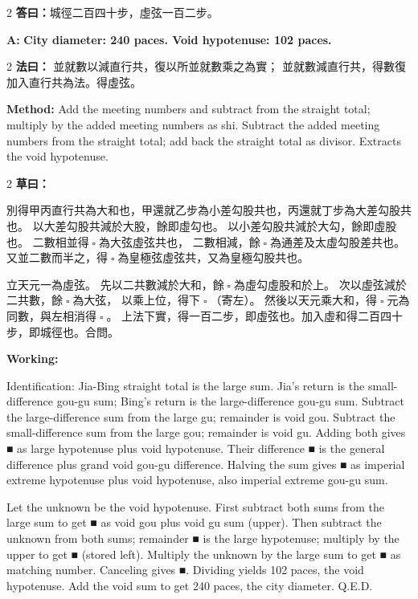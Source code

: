 \documentclass[11pt,a4paper]{article}
\let\origsquare\square
\renewcommand{\square}{\ensuremath{\origsquare}}%
\newcommand{\fayue}[1]{%
  \noindent\textcolor{methodcolor}{\textbf{法曰：}}{\tradfont #1}\par\nopagebreak%
}
\newcommand{\fayueeng}[1]{%
  \noindent\textcolor{engcolor}{\textbf{Method: }}{#1}\par\nopagebreak%
}
\newcommand{\tsaoyue}[1]{%
  \noindent\textcolor{workcolor}{\textbf{草曰：}}{\tradfont #1}\par%
}
\newcommand{\tsaoyueeng}[1]{%
  \noindent\textcolor{engcolor}{\textbf{Working: }}{\small #1}\par%
}
\newcommand{\dayue}[1]{%
  \noindent\textcolor{anscolor}{\textbf{答曰：}}{\tradfont #1}\par\nopagebreak%
}
\newcommand{\dayueeng}[1]{%
  \noindent\textcolor{engcolor}{\textbf{A: }}{\bfseries #1}\par\nopagebreak%
}
\begin{document}
\begin{paracol}{2}
\dayue{城徑二百四十步，虛弦一百二步。}
\switchcolumn
\dayueeng{City diameter: 240 paces. Void hypotenuse: 102 paces.}
\end{paracol}

\begin{paracol}{2}
\fayue{%
並就數以減直行共，復以所並就數乘之為實；
並就數減直行共，得數復加入直行共為法。得虛弦。}
\switchcolumn
\fayueeng{%
Add the meeting numbers and subtract from the straight total; multiply by the added meeting numbers as shi. Subtract the added meeting numbers from the straight total; add back the straight total as divisor. Extracts the void hypotenuse.}
\end{paracol}

\begin{paracol}{2}
\tsaoyue{%
別得甲丙直行共為大和也，甲還就乙步為小差勾股共也，丙還就丁步為大差勾股共也。
以大差勾股共減於大股，餘即虛勾也。
以小差勾股共減於大勾，餘即虛股也。
二數相並得$ \; \square \; $為大弦虛弦共也，
二數相減，餘$ \; \square \; $為通差及太虛勾股差共也。
又並二數而半之，得$ \; \square \; $為皇極弦虛弦共，又為皇極勾股共也。

立天元一為虛弦。
先以二共數減於大和，餘$ \; \square \; $為虛勾虛股和於上。
次以虛弦減於二共數，餘$ \; \square \; $為大弦，
以乘上位，得下$ \; \square \; $（寄左）。
然後以天元乘大和，得$ \; \square \; $元為同數，與左相消得$ \; \square \; $。
上法下實，得一百二步，即虛弦也。加入虛和得二百四十步，即城徑也。合問。}
\switchcolumn
\tsaoyueeng{%
Identification: Jia-Bing straight total is the large sum. Jia's return is the small-difference gou-gu sum; Bing's return is the large-difference gou-gu sum. Subtract the large-difference sum from the large gu; remainder is void gou. Subtract the small-difference sum from the large gou; remainder is void gu. Adding both gives ■ as large hypotenuse plus void hypotenuse. Their difference ■ is the general difference plus grand void gou-gu difference. Halving the sum gives ■ as imperial extreme hypotenuse plus void hypotenuse, also imperial extreme gou-gu sum.

Let the unknown be the void hypotenuse. First subtract both sums from the large sum to get ■ as void gou plus void gu sum (upper). Then subtract the unknown from both sums; remainder ■ is the large hypotenuse; multiply by the upper to get ■ (stored left). Multiply the unknown by the large sum to get ■ as matching number. Canceling gives ■. Dividing yields 102 paces, the void hypotenuse. Add the void sum to get 240 paces, the city diameter. Q.E.D.}
\end{paracol}
\end{document}
